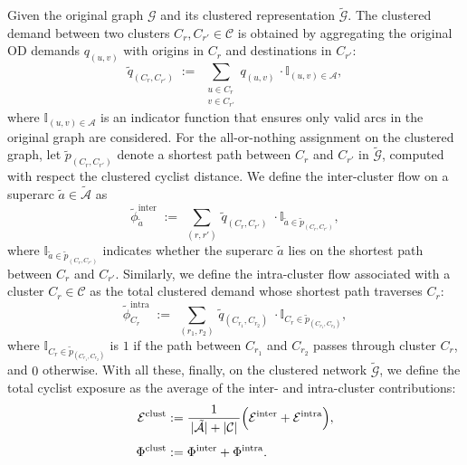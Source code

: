 \documentclass[lettersize,journal]{IEEEtran}
\begin{document}
Given the original graph $\mathcal{G}$ and its clustered representation $\tilde{\mathcal{G}}$. The clustered demand between two clusters $C_r, C_{r'} \in \mathcal{C}$ is obtained by aggregating the
original OD demands $q_{(u,v)}$ with origins in $C_r$ and destinations in $C_{r'}$:
\begin{equation}
\label{cluster_demand}
  \tilde{q}_{(C_r,C_{r'})}
  \;:=\;
  \sum_{\substack{u \in C_r \\ v \in C_{r'}}}
  q_{(u,v)} \, \cdot \mathbb{I}_{(u,v) \in \mathcal{A}},
\end{equation}
where $\mathbb{I}_{(u,v) \in \mathcal{A}}$ is an indicator function that ensures only valid arcs in the original graph are considered.  
For the all-or-nothing assignment on the clustered graph, let $\tilde{p}_{(C_r,C_{r'})}$ denote a shortest path between $C_r$ and $C_{r'}$ in $\tilde{\mathcal{G}}$,
computed with respect the clustered cyclist distance.
We define the inter-cluster flow on a superarc $\tilde{a} \in \tilde{\mathcal{A}}$ as
\begin{equation}
\label{eq_cluster_flow_inter}
  \tilde{\phi}^{\mathrm{inter}}_{\tilde{a}}
  \;:=\;
  \sum_{(r,r')}\,
    \tilde{q}_{(C_r,C_{r'})}\; \cdot 
    \mathbb{I}_{\tilde{a} \in \tilde{p}_{(C_r,C_{r'})}},
\end{equation}
where $\mathbb{I}_{\tilde{a} \in \tilde{p}_{(C_r,C_{r'})}}$ indicates whether the superarc $\tilde{a}$ lies on the
shortest path between $C_r$ and $C_{r'}$. Similarly, we define the intra-cluster flow associated with a cluster $C_r \in \mathcal{C}$ as the total clustered
demand whose shortest path traverses $C_r$:
\begin{equation}
  \tilde{\phi}^{\mathrm{intra}}_{C_r}
  \;:=\;
  \sum_{(r_1,r_2)}\,
    \tilde{q}_{(C_{r_1},C_{r_2})}\; \cdot
    \mathbb{I}_{C_r \in \tilde{p}_{(C_{r_1},C_{r_2})}},
\end{equation}
where $\mathbb{I}_{C_r \in \tilde{p}_{(C_{r_1},C_{r_2})}}$ is $1$ if the path between $C_{r_1}$ and $C_{r_2}$ passes
through cluster $C_r$, and $0$ otherwise. With all these, finally, on the clustered network $\tilde{\mathcal{G}}$, we define the total cyclist exposure as the average of the inter- and
intra-cluster contributions:
\begin{equation}
\begin{aligned}
  \mathcal{E}^{\mathrm{clust}}
  &:= \frac{1}{\,|\tilde{\mathcal{A}}| + |\mathcal{C}|\,}
      \Bigl(
        \mathcal{E}^{\mathrm{inter}} + \mathcal{E}^{\mathrm{intra}}
      \Bigr), \\[0.4em]
  \Phi^{\mathrm{clust}}
  &:= \Phi^{\mathrm{inter}} + \Phi^{\mathrm{intra}}.
\end{aligned}
\end{equation}
\end{document}
